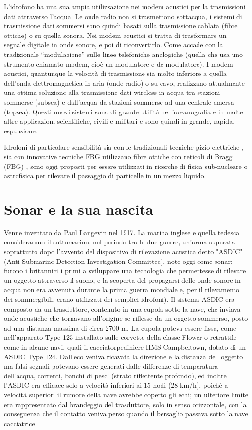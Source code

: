 L’idrofono ha una sua ampia utilizzazione nei modem acustici per la trasmissioni dati attraverso l’acqua. Le onde radio non si trasmettono sottacqua, i sistemi di trasmissione dati sommersi sono quindi basati sulla trasmissione cablata (fibre ottiche) o su quella sonora. Nei modem acustici si tratta di trasformare un segnale digitale in onde sonore, e poi di riconvertirlo. Come accade con la tradizionale “modulazione” sulle linee telefoniche analogiche (quella che usa uno strumento chiamato modem, cioè un modulatore e de-modulatore). I modem acustici, quantunque la velocità di trasmissione sia molto inferiore a quella dell’onda elettromagnetica in aria (onde radio) o su cavo, realizzano attualmente una ottima soluzione alla trasmissione dati wireless in acqua tra stazioni sommerse (subsea) e dall’acqua da stazioni sommerse ad una centrale emersa (topsea). Questi nuovi sistemi sono di grande utilità nell’oceanografia e in molte altre applicazioni scientifiche, civili e militari e sono quindi in grande, rapida, espansione. 

Idrofoni di particolare sensibilità sia con le tradizionali tecniche pizio-elettriche , sia con innovative tecniche FBG utilizzano fibre ottiche con reticoli di Bragg (FBG) , sono oggi proposti per essere utilizzati in ricerche di fisica sub-nucleare o astrofisica per rilevare il passaggio di particelle in un mezzo liquido.

\section {Sonar e la sua nascita}

Venne inventato da Paul Langevin nel 1917. La marina inglese e quella tedesca considerarono il sottomarino, nel periodo tra le due guerre, un'arma superata soprattutto dopo l'avvento del dispositivo di rilevazione acustica detto "ASDIC" (Anti-Submarine Detection Investigation Committee), noto oggi come sonar; furono i britannici i primi a sviluppare una tecnologia che permettesse di rilevare un oggetto attraverso il suono, e la scoperta del propagarsi delle onde sonore in acqua non era avvenuta durante la prima guerra mondiale e, per il rilevamento dei sommergibili, erano utilizzati dei semplici idrofoni). Il sistema ASDIC era composto da un trasduttore, contenuto in una cupola sotto la nave, che inviava onde acustiche che tornavano all'origine se riflesse da un oggetto sommerso, posto ad una distanza massima di circa 
2700 m. La cupola poteva essere fissa, come nell'apparato Type 123 installato sulle corvette della classe Flower o retrattile come in alcune navi, quali il cacciatorpediniere HMS Campbeltown, dotato di un ASDIC Type 124. Dall'eco veniva ricavata la direzione e la distanza dell'oggetto ma falsi segnali potevano essere generati dalle differenze di temperatura dell'acqua, correnti, banchi di pesci (strato riflettente profondo), ed inoltre l'ASDIC era efficace solo a velocità inferiori ai 15 nodi (28 km/h), poiché a velocità superiori il rumore della nave avrebbe coperto gli echi; un ulteriore limite era rappresentato dal brandeggio del trasduttore, solo in senso orizzontale, con la conseguenza che il contatto veniva perso quando il bersaglio passava sotto la nave cacciatrice.

